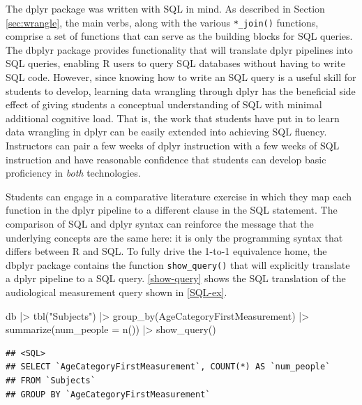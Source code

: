 \documentclass[12pt]{article}
\newenvironment{Shaded}{\begin{snugshade}}{\end{snugshade}}
\newcommand{\AttributeTok}[1]{\textcolor[rgb]{0.77,0.63,0.00}{#1}}
\newcommand{\FunctionTok}[1]{\textcolor[rgb]{0.00,0.00,0.00}{#1}}
\newcommand{\NormalTok}[1]{#1}
\newcommand{\SpecialCharTok}[1]{\textcolor[rgb]{0.00,0.00,0.00}{#1}}
\newcommand{\StringTok}[1]{\textcolor[rgb]{0.31,0.60,0.02}{#1}}
\begin{document}
The dplyr package was written with SQL in mind. As described in Section
\ref{sec:wrangle}, the main verbs, along with the various
\texttt{*\_join()} functions, comprise a set of functions that can serve
as the building blocks for SQL queries. The dbplyr package provides
functionality that will translate dplyr pipelines into SQL queries,
enabling R users to query SQL databases without having to write SQL
code. However, since knowing how to write an SQL query is a useful skill
for students to develop, learning data wrangling through dplyr has the
beneficial side effect of giving students a conceptual understanding of
SQL with minimal additional cognitive load. That is, the work that
students have put in to learn data wrangling in dplyr can be easily
extended into achieving SQL fluency. Instructors can pair a few weeks of
dplyr instruction with a few weeks of SQL instruction and have
reasonable confidence that students can develop basic proficiency in
\emph{both} technologies.

Students can engage in a comparative literature exercise in which they
map each function in the dplyr pipeline to a different clause in the SQL
statement. The comparison of SQL and dplyr syntax can reinforce the
message that the underlying concepts are the same here: it is only the
programming syntax that differs between R and SQL. To fully drive the
1-to-1 equivalence home, the dbplyr package contains the function
\texttt{show\_query()} that will explicitly translate a dplyr pipeline
to a SQL query. \ref{show-query} shows the SQL translation of the
audiological measurement query shown in \ref{SQL-ex}.

\linespread{1}

\begin{Shaded}
\begin{Highlighting}[]
\NormalTok{db }\SpecialCharTok{|\textgreater{}}
  \FunctionTok{tbl}\NormalTok{(}\StringTok{"Subjects"}\NormalTok{) }\SpecialCharTok{|\textgreater{}} 
  \FunctionTok{group\_by}\NormalTok{(AgeCategoryFirstMeasurement) }\SpecialCharTok{|\textgreater{}}
  \FunctionTok{summarize}\NormalTok{(}\AttributeTok{num\_people =} \FunctionTok{n}\NormalTok{()) }\SpecialCharTok{|\textgreater{}}
  \FunctionTok{show\_query}\NormalTok{()}
\end{Highlighting}
\end{Shaded}

\begin{verbatim}
## <SQL>
## SELECT `AgeCategoryFirstMeasurement`, COUNT(*) AS `num_people`
## FROM `Subjects`
## GROUP BY `AgeCategoryFirstMeasurement`
\end{verbatim}
\end{document}
